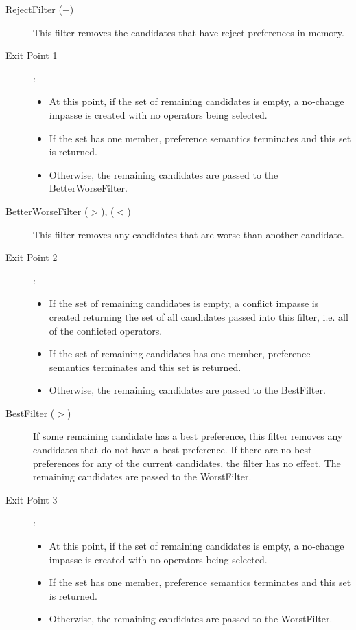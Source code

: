 \begin{description}
	\item[RejectFilter ($-$) ] This filter removes the candidates that have reject preferences in memory.

	\index{-}
	\item[Exit Point 1]:
	\begin{itemize}
		\item At this point, if the set of remaining candidates is empty, a no-change impasse is created with no operators being selected.
		\item If the set has one member, preference semantics terminates and this set is returned.
		\item Otherwise, the remaining candidates are passed to the BetterWorseFilter.
	\end{itemize}

	\item[BetterWorseFilter ($>$), ($<$) ] This filter removes any candidates that are worse than another candidate.

	\index{-}
	\item[Exit Point 2]:
	\begin{itemize}
		\item If the set of remaining candidates is empty, a conflict impasse is created returning the set of all candidates passed into this filter, i.e. all of the conflicted operators.
		\item If the set of remaining candidates has one member, preference semantics terminates and this set is returned.
		\item Otherwise, the remaining candidates are passed to the BestFilter.
	\end{itemize}

	\item[BestFilter ($>$) ] If some remaining candidate has a best preference, this filter removes any candidates that do not have a best preference. If there are no best preferences for any of the current candidates, the filter has no effect. The remaining candidates are passed to the WorstFilter.

	\index{-}
	\item[Exit Point 3]:
	\begin{itemize}
		\item At this point, if the set of remaining candidates is empty, a no-change impasse is created with no operators being selected.
		\item If  the set has one member, preference semantics terminates and this set is returned.
		\item Otherwise, the remaining candidates are passed to the WorstFilter.
	\end{itemize}


\end{description}
